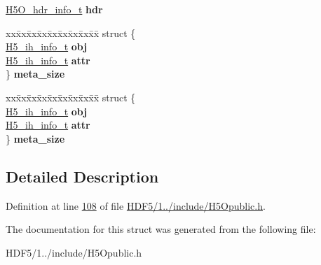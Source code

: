 \begin{DoxyCompactItemize}
\hyperlink{struct_h5_o__hdr__info__t}{H5\+O\+\_\+hdr\+\_\+info\+\_\+t} {\bfseries hdr}
\item 
\mbox{\label{struct_h5_o__info__t_af6d43a792cef600a4db77574a9b5be44}} 
\begin{tabbing}
xx\=xx\=xx\=xx\=xx\=xx\=xx\=xx\=xx\=\kill
struct \{\\
\>\hyperlink{struct_h5__ih__info__t}{H5\_ih\_info\_t} {\bfseries obj}\\
\>\hyperlink{struct_h5__ih__info__t}{H5\_ih\_info\_t} {\bfseries attr}\\
\} {\bfseries meta\_size}\\

\end{tabbing}\item 
\mbox{\label{struct_h5_o__info__t_aec5e2c192ed979c206d93da5a01a675d}} 
\begin{tabbing}
xx\=xx\=xx\=xx\=xx\=xx\=xx\=xx\=xx\=\kill
struct \{\\
\>\hyperlink{struct_h5__ih__info__t}{H5\_ih\_info\_t} {\bfseries obj}\\
\>\hyperlink{struct_h5__ih__info__t}{H5\_ih\_info\_t} {\bfseries attr}\\
\} {\bfseries meta\_size}\\

\end{tabbing}\end{DoxyCompactItemize}


\subsection{Detailed Description}


Definition at line \hyperlink{_h_d_f5_21_810_81_2include_2_h5_opublic_8h_source_l00108}{108} of file \hyperlink{_h_d_f5_21_810_81_2include_2_h5_opublic_8h_source}{H\+D\+F5/1../include/\+H5\+Opublic.\+h}.



The documentation for this struct was generated from the following file\+:\begin{DoxyCompactItemize}
\item 
H\+D\+F5/1../include/\+H5\+Opublic.\+h\end{DoxyCompactItemize}
